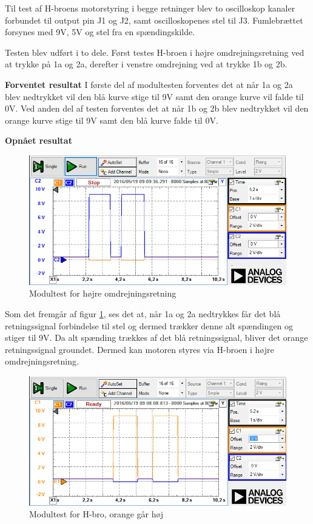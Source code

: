 \noindent Til test af H-broens motorstyring i begge retninger blev to oscilloskop kanaler forbundet til output pin J1 og J2, samt oscilloskopenes stel til J3. Fumlebrættet forsynes med 9V, 5V og stel fra en spændingskilde. 

\noindent Testen blev udført i to dele. Først testes H-broen i højre omdrejningsretning ved at trykke på 1a og 2a, derefter i venstre omdrejning ved at trykke 1b og 2b. \newline

\noindent \textbf{Forventet resultat} \newline
I første del af modultesten forventes det at når 1a og 2a blev nedtrykket vil den blå kurve stige til 9V samt den orange kurve vil falde til 0V. Ved anden del af testen forventes det at når 1b og 2b blev nedtrykket vil den orange kurve stige til 9V samt den blå kurve falde til 0V. \newline

\noindent \textbf{Opnået resultat}

\begin{figure}[H]
	\centering
	\includegraphics[width=\textwidth]{test/images/hbromob}
	\caption{Modultest for højre omdrejningsretning}
	\label{figure:hbrob}
\end{figure}

\noindent Som det fremgår af figur \ref{figure:hbrob}, ses det at, når 1a og 2a nedtrykkes får det blå retningssignal forbindelse til stel og dermed trækker denne alt spændingen og stiger til 9V. Da alt spænding trækkes af det blå retningssignal, bliver det orange retningssignal groundet. Dermed kan motoren styres via H-broen i højre omdrejningsretning. 

\begin{figure}[H]
	\centering
	\includegraphics[width=\textwidth]{test/images/hbromoo}
	\caption{Modultest for H-bro, orange går høj}
	\label{figure:hbroo}
	
\end{figure}

